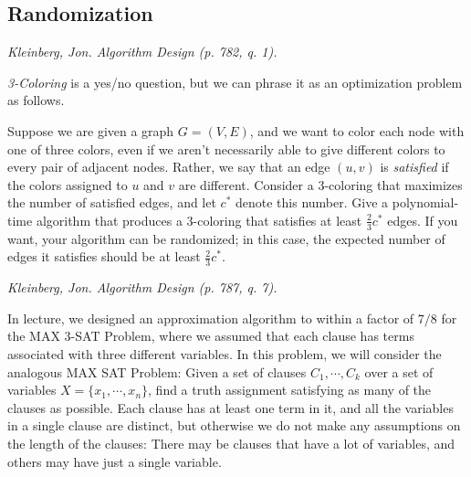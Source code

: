 \documentclass[solutionorbox,answers]{exam}
\begin{document}
\begin{center}
\end{center}
\vspace{0.1in}
 \qquad
{}

\begin{questions}

\section*{Randomization}

\question  \textit{Kleinberg, Jon. Algorithm Design (p. 782, q. 1).} 

\textit{3-Coloring} is a yes/no question, but we can phrase it as an optimization problem as follows.

Suppose we are given a graph $G=(V,E)$, and we want to color each node with one of three colors,
even if we aren't necessarily able to give different colors to every pair of adjacent nodes. Rather, we
say that an edge $(u,v)$ is \textit{satisfied} if the colors assigned to $u$ and $v$ are different. Consider a $3$-coloring
that maximizes the number of satisfied edges, and let $c^*$ denote this number. Give a polynomial-time
algorithm that produces a $3$-coloring that satisfies at least $\frac{2}{3}c^*$ edges. If you want, your algorithm can
be randomized; in this case, the expected number of edges it satisfies should be at least $\frac{2}{3}c^*$.

\begin{solutionbox}{} \vspace{1em}


\end{solutionbox}

\newpage

\question  \textit{Kleinberg, Jon. Algorithm Design (p. 787, q. 7).}

In lecture, we designed an approximation algorithm to within a factor of $7/8$ for the MAX $3$-SAT
Problem, where we assumed that each clause has terms associated with three different variables. In this
problem, we will consider the analogous MAX SAT Problem: Given a set of clauses $C_1, \cdots, C_k$ over a
set of variables $X=\{x_1,\cdots, x_n\}$, find a truth assignment satisfying as many of the clauses as possible.
Each clause has at least one term in it, and all the variables in a single clause are distinct, but otherwise
we do not make any assumptions on the length of the clauses: There may be clauses that have a lot of
variables, and others may have just a single variable.


\end{questions}
\end{document}
